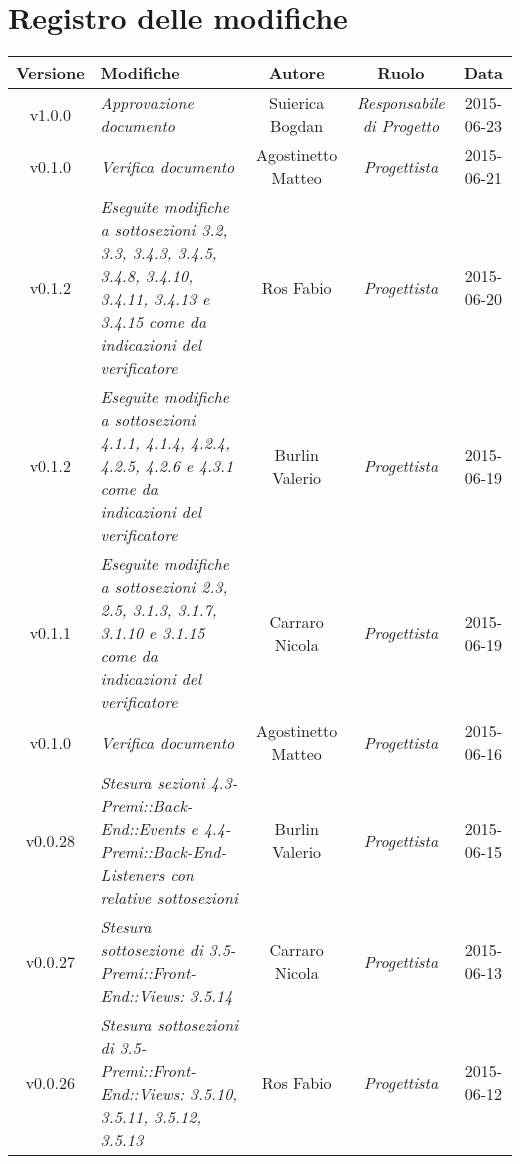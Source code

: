 \newpage
\section*{Registro delle modifiche}

\begin{table}[h]
\centering
\begin{tabular}{|c|p{}|c|c|c|}
	\toprule
		\textbf{Versione} & \textbf{Modifiche} & \textbf{Autore} & \textbf{Ruolo} & \textbf{Data}\\
	\midrule
	\midrule
		v1.0.0 & \textit{Approvazione documento} & Suierica Bogdan & \textit{Responsabile di Progetto} & 2015-06-23\\
	\midrule
		v0.1.0 & \textit{Verifica documento} & Agostinetto Matteo & \textit{Progettista} & 2015-06-21\\	
	\midrule
		v0.1.2 & \textit{Eseguite modifiche a sottosezioni 3.2, 3.3, 3.4.3, 3.4.5, 3.4.8, 3.4.10, 3.4.11, 3.4.13 e 3.4.15 come da indicazioni del verificatore} & Ros Fabio & \textit{Progettista} & 2015-06-20\\
	\midrule
		v0.1.2 & \textit{Eseguite modifiche a sottosezioni 4.1.1, 4.1.4, 4.2.4, 4.2.5, 4.2.6 e 4.3.1 come da indicazioni del verificatore} & Burlin Valerio & \textit{Progettista} & 2015-06-19\\
	\midrule
		v0.1.1 & \textit{Eseguite modifiche a sottosezioni 2.3, 2.5, 3.1.3, 3.1.7, 3.1.10 e 3.1.15 come da indicazioni del verificatore} & Carraro Nicola & \textit{Progettista} & 2015-06-19\\
	\midrule
		v0.1.0 & \textit{Verifica documento} & Agostinetto Matteo & \textit{Progettista} & 2015-06-16\\	
	\midrule
		v0.0.28 & \textit{Stesura sezioni 4.3-Premi::Back-End::Events e 4.4-Premi::Back-End-Listeners con relative sottosezioni } & Burlin Valerio & \textit{Progettista} & 2015-06-15\\
	\midrule
		v0.0.27 & \textit{Stesura sottosezione di 3.5-Premi::Front-End::Views: 3.5.14} & Carraro Nicola & \textit{Progettista} & 2015-06-13\\
	\midrule
		v0.0.26 & \textit{Stesura sottosezioni di 3.5-Premi::Front-End::Views: 3.5.10, 3.5.11, 3.5.12, 3.5.13} & Ros Fabio & \textit{Progettista} & 2015-06-12\\
	\bottomrule
\end{tabular}
\end{table}

\newpage

